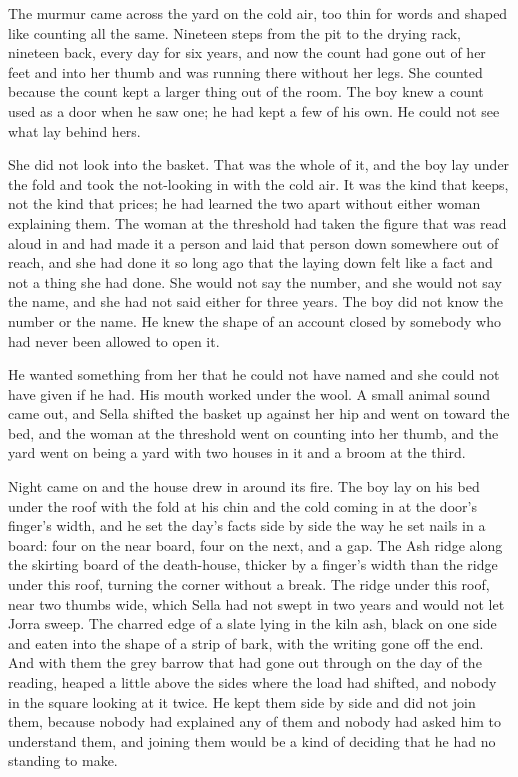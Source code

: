 The murmur came across the yard on the cold air, too thin for words and shaped like counting all the same. Nineteen steps from the pit to the drying rack, nineteen back, every day for six years, and now the count had gone out of her feet and into her thumb and was running there without her legs. She counted because the count kept a larger thing out of the room. The boy knew a count used as a door when he saw one; he had kept a few of his own. He could not see what lay behind hers.

She did not look into the basket. That was the whole of it, and the boy lay under the fold and took the not-looking in with the cold air. It was the kind that keeps, not the kind that prices; he had learned the two apart without either woman explaining them. The woman at the threshold had taken the figure that was read aloud in  and had made it a person and laid that person down somewhere out of reach, and she had done it so long ago that the laying down felt like a fact and not a thing she had done. She would not say the number, and she would not say the name, and she had not said either for three years. The boy did not know the number or the name. He knew the shape of an account closed by somebody who had never been allowed to open it.

He wanted something from her that he could not have named and she could not have given if he had. His mouth worked under the wool. A small animal sound came out, and Sella shifted the basket up against her hip and went on toward the bed, and the woman at the threshold went on counting into her thumb, and the yard went on being a yard with two houses in it and a broom at the third.

\scenebreak

Night came on and the house drew in around its fire. The boy lay on his bed under the roof with the fold at his chin and the cold coming in at the door's finger's width, and he set the day's facts side by side the way he set nails in a board: four on the near board, four on the next, and a gap. The Ash ridge along the skirting board of the death-house, thicker by a finger's width than the ridge under this roof, turning the corner without a break. The ridge under this roof, near two thumbs wide, which Sella had not swept in two years and would not let Jorra sweep. The charred edge of a slate lying in the kiln ash, black on one side and eaten into the shape of a strip of bark, with the writing gone off the end. And with them the grey barrow that had gone out through  on the day of the reading, heaped a little above the sides where the load had shifted, and nobody in the square looking at it twice. He kept them side by side and did not join them, because nobody had explained any of them and nobody had asked him to understand them, and joining them would be a kind of deciding that he had no standing to make.


